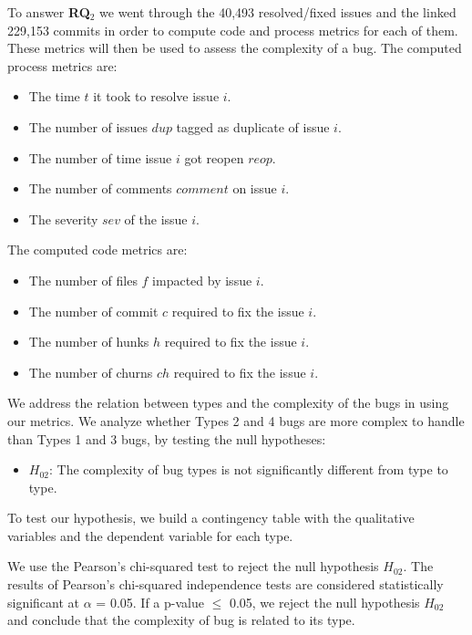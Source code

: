 \documentclass[natbib]{svjour3}
\providecommand{\tightlist}{%
  \setlength{\itemsep}{0pt}\setlength{\parskip}{0pt}}
\begin{document}
To answer \textbf{RQ\(_2\)} we went through the 40,493 resolved/fixed
issues and the linked 229,153 commits in order to compute code and
process metrics for each of them. These metrics will then be used to
assess the complexity of a bug. The computed process metrics are:

\begin{itemize}
\tightlist
\item
  The time \(t\) it took to resolve issue \(i\).
\item
  The number of issues \(dup\) tagged as duplicate of issue \(i\).
\item
  The number of time issue \(i\) got reopen \(reop\).
\item
  The number of comments \(comment\) on issue \(i\).
\item
  The severity \(sev\) of the issue \(i\).
\end{itemize}

The computed code metrics are:

\begin{itemize}
\tightlist
\item
  The number of files \(f\) impacted by issue \(i\).
\item
  The number of commit \(c\) required to fix the issue \(i\).
\item
  The number of hunks \(h\) required to fix the issue \(i\).
\item
  The number of churns \(ch\) required to fix the issue \(i\).
\end{itemize}

We address the relation between types and the complexity of the bugs in
using our metrics. We analyze whether Types 2 and 4 bugs are more
complex to handle than Types 1 and 3 bugs, by testing the null
hypotheses:

\begin{itemize}
\tightlist
\item
  \(H_{02}\): The complexity of bug types is not significantly different
  from type to type.
\end{itemize}

To test our hypothesis, we build a contingency table with the
qualitative variables and the dependent variable for each type.

We use the Pearson's chi-squared test to reject the null hypothesis
\(H_{02}\). The results of Pearson's chi-squared independence tests are
considered statistically significant at \(\alpha\) = 0.05. If a p-value
\(\le\) 0.05, we reject the null hypothesis \(H_{02}\) and conclude that
the complexity of bug is related to its type.
\end{document}
